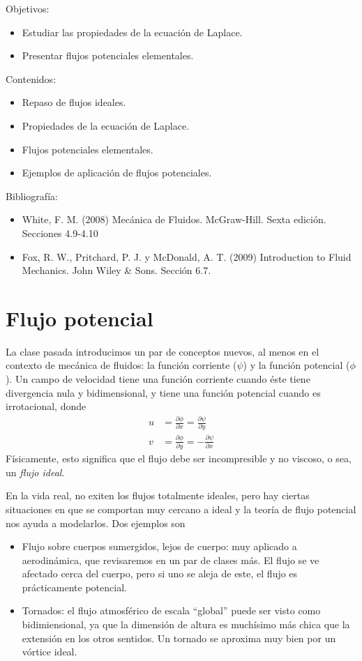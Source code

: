 \begin{framed}

Objetivos:
\begin{itemize}
    \item Estudiar las propiedades de la ecuación de Laplace. 
    \item Presentar flujos potenciales elementales. 
\end{itemize}

Contenidos:
\begin{itemize}
    \item Repaso de flujos ideales.
    \item Propiedades de la ecuación de Laplace.
    \item Flujos potenciales elementales.
    \item Ejemplos de aplicación de flujos potenciales.
\end{itemize}

Bibliografía:
\begin{itemize}
    \item White, F. M. (2008) Mecánica de Fluidos. McGraw-Hill. Sexta edición. Secciones 4.9-4.10
    \item Fox, R. W., Pritchard, P. J. y McDonald, A. T. (2009) Introduction to Fluid Mechanics. John Wiley \& Sons. Sección 6.7.
\end{itemize}
\end{framed}

\section*{Flujo potencial}
La clase pasada introducimos un par de conceptos nuevos, al menos en el contexto de mecánica de fluidos: la función corriente ($\psi$) y la función potencial ($\phi$). 
Un campo de velocidad tiene una función corriente cuando éste tiene divergencia nula y bidimensional, y tiene una función potencial cuando es irrotacional, donde
%
\begin{align}\label{eq:phi_def_3}
u &= \frac{\partial\phi}{\partial x} = \frac{\partial\psi}{\partial y}\nonumber\\
v &= \frac{\partial\phi}{\partial y} = -\frac{\partial\psi}{\partial x}
\end{align}
%
Físicamente, esto significa que el flujo debe ser incompresible y no viscoso, o sea, un \emph{flujo ideal}.

En la vida real, no exiten los flujos totalmente ideales, pero hay ciertas situaciones en que se comportan muy cercano a ideal y la teoría de flujo potencial nos ayuda a modelarlos.
Dos ejemplos son
\begin{itemize}
\item Flujo sobre cuerpos sumergidos, lejos de cuerpo: muy aplicado a aerodinámica, que revisaremos en un par de clases más. El flujo se ve afectado cerca del cuerpo, pero si uno se aleja de este, el flujo es prácticamente potencial.
\item Tornados: el flujo atmosférico de escala ``global'' puede ser visto como bidimiensional, ya que la dimensión de altura es muchísimo más chica que la extensión en los otros sentidos. Un tornado se aproxima muy bien por un vórtice ideal.
\end{itemize}

